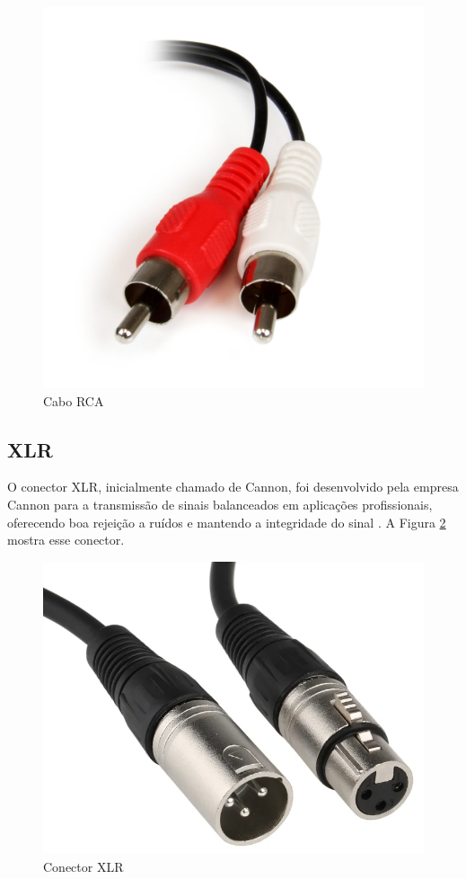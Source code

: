 \begin{figure}[h]
	\centering
    \includegraphics[scale=0.1]{figuras/fig22.png}
	\caption{Cabo RCA \cite{rs}}
	\label{fig22}
\end{figure}

\subsection{XLR}

O conector XLR, inicialmente chamado de Cannon, foi desenvolvido pela empresa Cannon para a transmissão de sinais balanceados em aplicações profissionais, oferecendo boa rejeição a ruídos e mantendo a integridade do sinal \cite{bartlett}. A Figura \ref{fig23} mostra esse conector.

\begin{figure}[h]
	\centering
    \includegraphics[scale=0.2]{figuras/fig23.png}
	\caption{Conector XLR \cite{hollylandWhatCable}}
	\label{fig23}
\end{figure}

